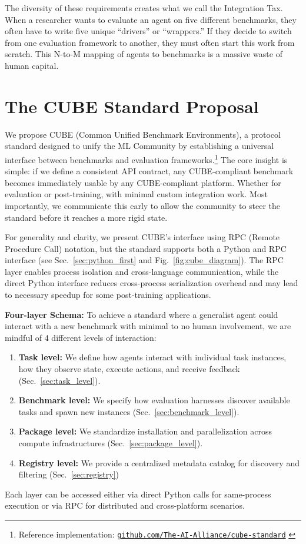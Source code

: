 \documentclass{article}
\theoremstyle{plain}
\theoremstyle{definition}
\theoremstyle{remark}
\begin{document}
The diversity of these requirements creates what we call the Integration Tax. When a researcher wants to evaluate an agent on five different benchmarks, they often have to write five unique ``drivers'' or ``wrappers.'' If they decide to switch from one evaluation framework to another, they must often start this work from scratch. This N-to-M mapping of agents to benchmarks is a massive waste of human capital.

\section{The CUBE Standard Proposal}
\label{sec:cube_proposal}

We propose CUBE (Common Unified Benchmark Environments), a protocol standard designed to unify the ML Community by establishing a universal interface between benchmarks and evaluation frameworks.\footnote{Reference implementation: \href{https://github.com/The-AI-Alliance/cube-standard}{\texttt{github.com/The-AI-Alliance/cube-standard}} \citep{cube-standard-repo}} The core insight is simple: if we define a consistent API contract, any CUBE-compliant benchmark becomes immediately usable by any CUBE-compliant platform. Whether for evaluation or post-training, with minimal custom integration work. Most importantly, we communicate this early to allow the community to steer the standard before it reaches a more rigid state.

For generality and clarity, we present CUBE's interface using RPC (Remote Procedure Call) notation, but the standard supports both a Python and RPC interface (see Sec.~\ref{sec:python_first} and Fig.~\ref{fig:cube_diagram}). The RPC layer enables process isolation and cross-language communication, while the direct Python interface reduces cross-process serialization overhead and may lead to necessary speedup for some post-training applications.

\textbf{Four-layer Schema:} To achieve a standard where a generalist agent could interact with a new benchmark with minimal to no human involvement, we are mindful of 4 different levels of interaction:
\begin{enumerate}[nosep,leftmargin=*,topsep=0pt,partopsep=0pt,parsep=0pt,itemsep=0pt]
    \item \textbf{Task level:} We define how agents interact with individual task instances, how they observe state, execute actions, and receive feedback (Sec.~\ref{sec:task_level}).
    \item \textbf{Benchmark level:} We specify how evaluation harnesses discover available tasks and spawn new instances (Sec.~\ref{sec:benchmark_level}).
    \item \textbf{Package level:} We standardize installation and parallelization across compute infrastructures (Sec.~\ref{sec:package_level}).
    \item \textbf{Registry level:} We provide a centralized metadata catalog for discovery and filtering (Sec.~\ref{sec:registry})
\end{enumerate}
Each layer can be accessed either via direct Python calls for same-process execution or via RPC for distributed and cross-platform scenarios.
\end{document}
